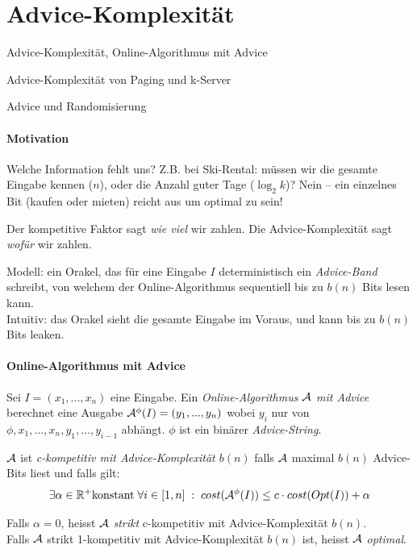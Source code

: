 \section{Advice-Komplexität}

\begin{takeaway}
    \item Advice-Komplexität, Online-Algorithmus mit Advice
    \item Advice-Komplexität von Paging und k-Server
    \item Advice und Randomisierung
\end{takeaway}

\paragraph{Motivation}
Welche Information fehlt uns? Z.B. bei Ski-Rental: müssen wir die gesamte Eingabe kennen ($n$),
oder die Anzahl guter Tage ($\log_2 k$)?
Nein -- ein einzelnes Bit (kaufen oder mieten) reicht aus um optimal zu sein!

Der kompetitive Faktor sagt \emph{wie viel} wir zahlen.
Die Advice-Komplexität sagt \emph{wofür} wir zahlen.

Modell: ein Orakel, das für eine Eingabe $I$ deterministisch ein \emph{Advice-Band}
schreibt, von welchem der Online-Algorithmus sequentiell bis zu $b(n)$ Bits lesen kann.
\\
Intuitiv: das Orakel sieht die gesamte Eingabe im Voraus, und kann bis zu $b(n)$ Bits leaken.

\paragraph{Online-Algorithmus mit Advice}
Sei $I=(x_1, ..., x_n)$ eine Eingabe.
Ein \emph{Online-Algorithmus $\mathcal{A}$ mit Advice} berechnet eine Ausgabe
$\mathcal{A}^{\phi}(I) = (y_1, ..., y_n)$ wobei $y_i$ nur von $\phi, x_1, ..., x_n, y_1, ..., y_{i-1}$ abhängt.
$\phi$ ist ein binärer \emph{Advice-String}.

$\mathcal{A}$ ist \emph{c-kompetitiv mit Advice-Komplexität $b(n)$} falls $\mathcal{A}$ maximal $b(n)$ Advice-Bits liest
und falls gilt:
$$ \exists \alpha \in \mathbb{R}^+ \text{konstant} \; \forall i \in [1,n] \; : \; cost(\mathcal{A}^{\phi}(I)) \leq c \cdot cost(Opt(I)) + \alpha $$

Falls $\alpha = 0$, heisst $\mathcal{A}$ \emph{strikt} c-kompetitiv mit Advice-Komplexität $b(n)$. \\
Falls $\mathcal{A}$ strikt 1-kompetitiv mit Advice-Komplexität $b(n)$ ist, heisst $\mathcal{A}$ \emph{optimal}.

